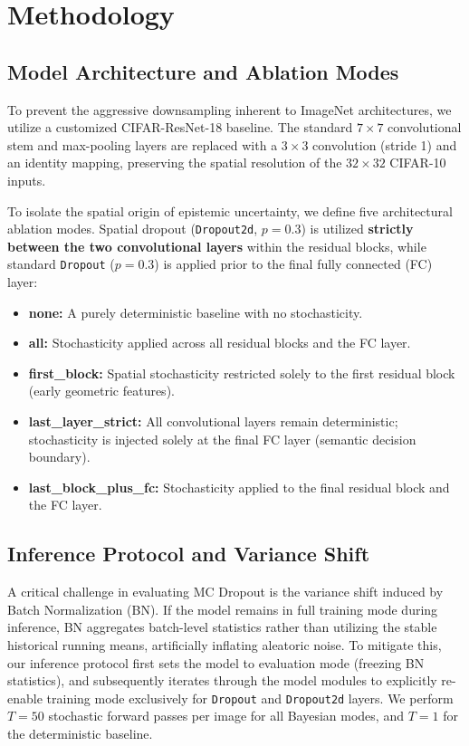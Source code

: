 \documentclass[10pt,twocolumn,letterpaper]{article}
\begin{document}
\section{Methodology}

\subsection{Model Architecture and Ablation Modes}
To prevent the aggressive downsampling inherent to ImageNet architectures, we utilize a customized CIFAR-ResNet-18 baseline. The standard $7 \times 7$ convolutional stem and max-pooling layers are replaced with a $3 \times 3$ convolution (stride 1) and an identity mapping, preserving the spatial resolution of the $32 \times 32$ CIFAR-10 inputs. 

To isolate the spatial origin of epistemic uncertainty, we define five architectural ablation modes. Spatial dropout (\texttt{Dropout2d}, $p=0.3$) is utilized \textbf{strictly between the two convolutional layers} within the residual blocks, while standard \texttt{Dropout} ($p=0.3$) is applied prior to the final fully connected (FC) layer:
\begin{itemize}
    \item \textbf{none:} A purely deterministic baseline with no stochasticity.
    \item \textbf{all:} Stochasticity applied across all residual blocks and the FC layer.
    \item \textbf{first\_block:} Spatial stochasticity restricted solely to the first residual block (early geometric features).
    \item \textbf{last\_layer\_strict:} All convolutional layers remain deterministic; stochasticity is injected solely at the final FC layer (semantic decision boundary).
    \item \textbf{last\_block\_plus\_fc:} Stochasticity applied to the final residual block and the FC layer.
\end{itemize}

\subsection{Inference Protocol and Variance Shift}
A critical challenge in evaluating MC Dropout is the variance shift induced by Batch Normalization (BN). If the model remains in full training mode during inference, BN aggregates batch-level statistics rather than utilizing the stable historical running means, artificially inflating aleatoric noise. To mitigate this, our inference protocol first sets the model to evaluation mode (freezing BN statistics), and subsequently iterates through the model modules to explicitly re-enable training mode exclusively for \texttt{Dropout} and \texttt{Dropout2d} layers. We perform $T=50$ stochastic forward passes per image for all Bayesian modes, and $T=1$ for the deterministic baseline.
\end{document}
